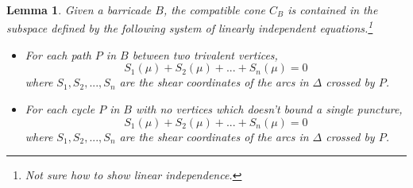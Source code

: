 \documentclass{amsart}
\newtheorem{corollary}[proposition]{Corollary}
\newtheorem{lemma}[proposition]{Lemma}
\theoremstyle{definition}
\newtheorem{definition}[proposition]{Definition}
\theoremstyle{remark}
\numberwithin{equation}{section}
\newcommand{\newword}[1]{\textbf{\emph{#1}}}
\newcommand{\0}{{\mathbf{0}}}
\newcommand{\M}{\mathcal{M}}
\renewcommand{\S}{\mathbf{S}}
\begin{document}
\begin{lemma}
Given a barricade $B$, the compatible cone $C_B$ is contained in the subspace defined by the following system of linearly independent equations.\footnote{Not sure how to show linear independence.}
\begin{itemize}
	\item For each path $P$ in $B$ between two trivalent vertices, 
	\[ S_{1}(\mu) + S_{2}(\mu) + ... + S_{n}(\mu) = 0\]
	where $S_1, S_2,...,S_n$ are the shear coordinates of the arcs in $\Delta$ crossed by $P$.
	\item For each cycle $P$ in $B$ with no vertices which doesn't bound a single puncture,
	\[ S_{1}(\mu) + S_{2}(\mu) + ... + S_{n}(\mu) = 0\]
	where $S_1, S_2,...,S_n$ are the shear coordinates of the arcs in $\Delta$ crossed by $P$.
\end{itemize}
\end{lemma}

\end{document}
